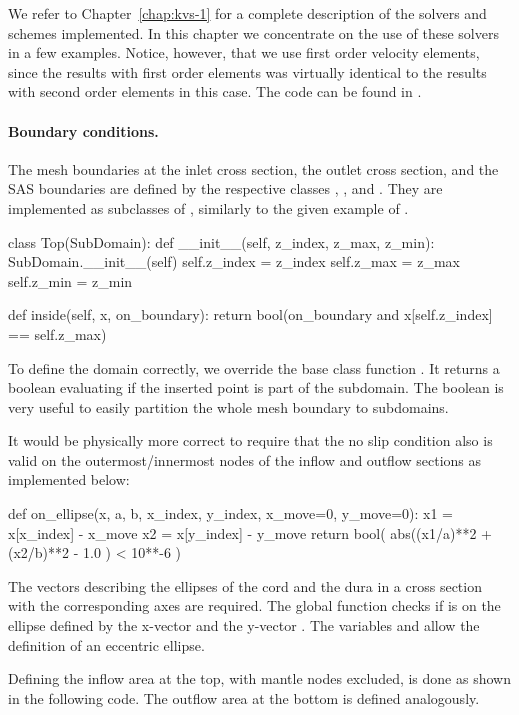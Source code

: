 We refer to Chapter~\ref{chap:kvs-1} for a complete description of the
solvers and schemes implemented. In this chapter we concentrate on the use
of these solvers in a few examples. Notice, however, that we use first
order velocity elements, since the results with first order elements
was virtually identical to the results with second order elements in
this case.  The code can be found in .

\paragraph{Boundary conditions.}
The mesh boundaries at the inlet cross section, the outlet cross
section, and the SAS boundaries are defined by the respective
classes , , and . They are
implemented as subclasses of , similarly to the given
example of .
\begin{python}
class Top(SubDomain):
	def __init__(self, z_index, z_max, z_min):
		SubDomain.__init__(self)
		self.z_index = z_index
		self.z_max = z_max
		self.z_min = z_min

	def inside(self, x, on_boundary):
		return bool(on_boundary and x[self.z_index] == self.z_max)
\end{python}
To define the domain correctly, we override the base class
function . It returns a boolean evaluating if the inserted
point  is part of the subdomain. The boolean 
is very useful to easily partition the whole mesh boundary to
subdomains.

It would be physically more correct to require that the no slip
condition also is valid on the outermost/innermost nodes of the inflow
and outflow sections as implemented below:
\begin{python}
def on_ellipse(x, a, b, x_index, y_index, x_move=0, y_move=0):
	x1 = x[x_index] - x_move
	x2 = x[y_index] - y_move
	return bool( abs((x1/a)**2 + (x2/b)**2 - 1.0 ) < 10**-6 )
\end{python}
The vectors describing the ellipses of the cord and the dura in a
cross section with the corresponding axes are required. The global
function  checks if  is on the ellipse defined
by the x-vector  and the y-vector . The
variables  and  allow the definition of an
eccentric ellipse.

Defining the inflow area at the top, with mantle nodes excluded, is
done as shown in the following code. The outflow area at the bottom is
defined analogously.

